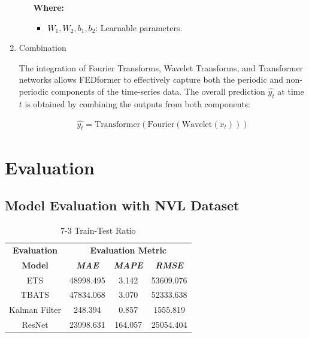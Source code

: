 \documentclass[conference]{IEEEtran}
\begin{document}
\begin{enumerate}
\begin{enumerate}
            \textbf{Where:}

            \begin{itemize}
                \item $W_1, W_2, b_1, b_2$: Learnable parameters.
            \end{itemize}

        \end{enumerate}

    \item Combination

    The integration of Fourier Transforms, Wavelet Transforms, and Transformer networks allows FEDformer to effectively capture both the periodic and non-periodic components of the time-series data. The overall prediction $\hat{y_t}$ at time $t$ is obtained by combining the outputs from both components:

    \begin{align*}
        \hat{y_t} = \text{Transformer}(\text{Fourier}(\text{Wavelet}(x_t)))
    \end{align*}

\end{enumerate}

\section{Evaluation}
\newpage
\subsection{Model Evaluation with NVL Dataset}

\begin{table}[htbp]
\caption{7-3 Train-Test Ratio}
\begin{center}
\begin{tabular}{|c|c|c|c|}
\hline
\textbf{Evaluation}&\multicolumn{3}{|c|}{\textbf{Evaluation Metric}} \\
\cline{2-4}
\textbf{Model} & \textbf{\textit{MAE}}& \textbf{\textit{MAPE}}& \textbf{\textit{RMSE}} \\
\hline
ETS & 48998.495 & 3.142 & 53609.076\\
\hline
TBATS & 47834.068 & 3.070 & 52333.638\\
\hline
Kalman Filter & 248.394 & 0.857 & 1555.819\\
\hline
ResNet & 23998.631 & 164.057 & 25054.404\\
\hline
\end{tabular}
\label{tab1}
\end{center}
\end{table}
\end{document}
